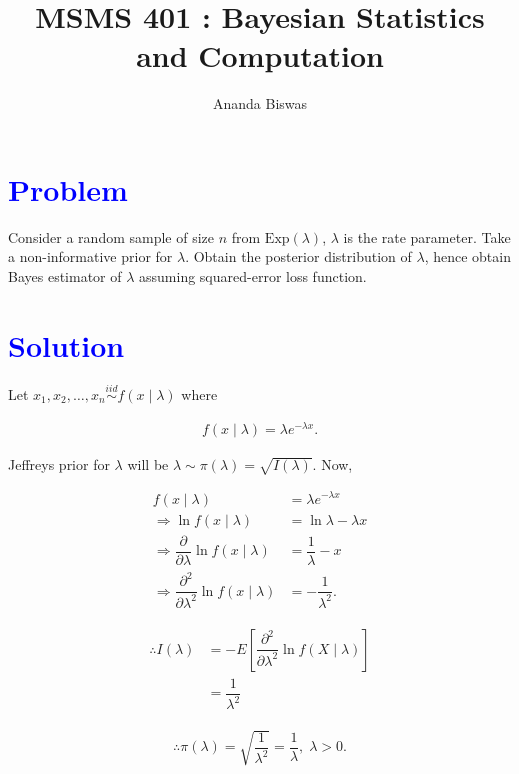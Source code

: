 \documentclass[12pt, a4paper]{article}
\title{MSMS 401 : Bayesian Statistics and Computation}
\author{{\fontsize{25}{20} \benyorithafont Ananda Biswas}}
\date{}
\begin{document}
\maketitle

\section*{\faArrowAltCircleRight[regular] \textcolor{blue}{Problem}}

Consider a random sample of size $n$ from $\text{Exp}(\lambda)$, $\lambda$ is the rate parameter. Take a non-informative prior for $\lambda$. Obtain the posterior distribution of $\lambda$, hence obtain Bayes estimator of $\lambda$ assuming squared-error loss function.

\section*{\faArrowAltCircleRight[regular] \textcolor{blue}{Solution}}

Let $x_1, x_2, \ldots, x_n \overset{iid}{\sim} f(x \mid \lambda)$ where

\begin{align*}
f(x \mid \lambda) = \lambda e^{-\lambda x}.
\end{align*}

Jeffreys prior for $\lambda$ will be $\lambda \sim \pi(\lambda) = \sqrt{I(\lambda)}$. Now, 

\begin{align*}
f(x \mid \lambda) &= \lambda e^{-\lambda x} \\[1em]
\Rightarrow \ln f(x \mid \lambda) &= \ln \lambda-\lambda x \\[1em]
\Rightarrow \dfrac{\partial}{\partial \lambda} \ln f(x\mid \lambda) &=
\dfrac{1}{\lambda} - x \\[1em]
\Rightarrow \dfrac{\partial^2}{\partial \lambda^2} \ln f(x\mid \lambda) &= -\dfrac{1}{\lambda^2}.
\end{align*}

\begin{align*}
\therefore I(\lambda) &= -E\left[ \dfrac{\partial^2}{\partial \lambda^2} \ln f(X \mid \lambda) \right] \\[1em]
&= \dfrac{1}{\lambda^2}
\end{align*}

\begin{align*}
\therefore \pi(\lambda) = \sqrt{\dfrac{1}{\lambda^2}} = \dfrac{1}{\lambda}, \; \lambda > 0.
\end{align*}
\end{document}
